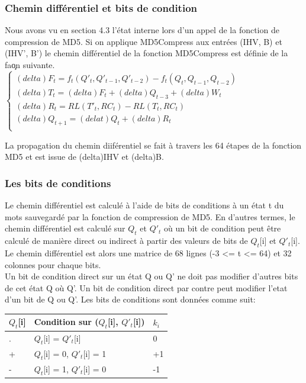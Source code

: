 \documentclass[a4paper,11pt,french]{article}
\begin{document}
\subsubsection{Chemin différentiel et bits de condition}
Nous avons vu en section 4.3 l'état interne lors d'un appel de la fonction de compression de MD5. Si on applique MD5Compress aux entrées (IHV, B) et (IHV', B') le chemin différentiel de la fonction MD5Compress est définie de la fa\c on suivante.\\

$\left\{
\begin{array}{l}
  (delta)F_t = f_t(Q'_t, Q'_{t-1}, Q'_{t-2}) - f_t(Q_t, Q_{t-1}, Q_{t-2}) \\
  (delta)T_t = (delta)F_t + (delta)Q_{t-3} + (delta)W_t \\
  (delta)R_t = RL(T'_t, RC_t) - RL(T_t, RC_t) \\
  (delta)Q_{t+1} = (delat)Q_t + (delta)R_t \\
\end{array}
\right.$
\vspace{.5cm}

La propagation du chemin diiférentiel se fait à travers les 64 étapes de la fonction MD5 et est issue de (delta)IHV et (delta)B.

\subsubsection{Les bits de conditions}
Le chemin différentiel est calculé à l'aide de bits de conditions à un état t du mots sauvegardé par la fonction de compression de MD5. En d'autres termes, le chemin différentiel est calculé sur $Q_t$ et $Q'_t$ où un bit de condition peut être calculé de manière direct ou indirect à partir des valeurs de bits de $Q_t$[i] et $Q'_t$[i]. Le chemin différentiel est alors une matrice de 68 lignes (-3 <= t <= 64) et 32 colonnes pour chaque bits.\\

Un bit de condition direct sur un état Q ou Q' ne doit pas modifier d'autres bits de cet état Q où Q'. Un bit de condition direct par contre peut modifier l'etat d'un bit de Q ou Q'. Les bits de conditions sont données comme suit:\\


\begin{tabular}{lll}
\hline
	$Q_t$[i] &\vline \hspace{.1cm} Condition sur ($Q_t$[i], $Q'_t$[i]) &\vline \hspace{.1cm} $k_i$ \\ \hline
	. &\vline \hspace{.1cm} $Q_t$[i] = $Q'_t$[i] &\vline \hspace{.1cm} 0 \\ \hline
	+ &\vline \hspace{.1cm} $Q_t$[i] = 0, $Q'_t$[i] = 1 &\vline \hspace{.1cm} +1 \\ \hline
	- &\vline \hspace{.1cm} $Q_t$[i] = 1, $Q'_t$[i] = 0 &\vline \hspace{.1cm} -1 \\ \hline
\end{tabular}
\end{document}
